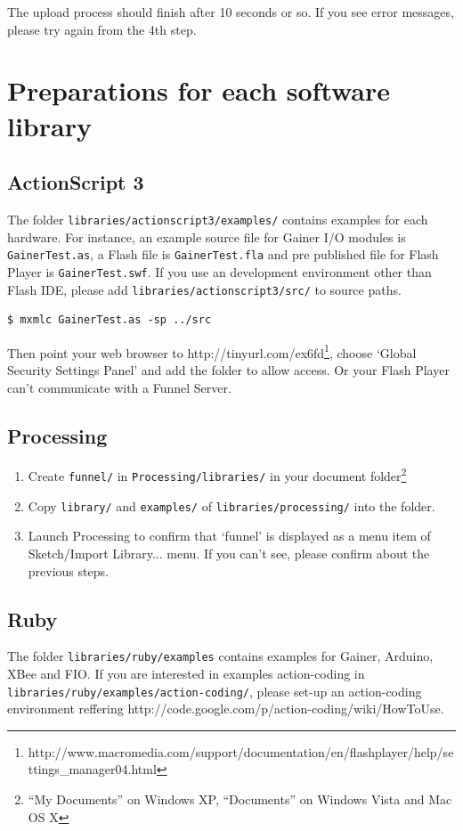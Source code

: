 \documentclass[9pt]{jsarticle}
\begin{document}
The upload process should finish after 10 seconds or so. If you see error messages, please try again from the 4th step.

\clearpage
\section{Preparations for each software library}
\subsection{ActionScript 3}
The folder \texttt{libraries/actionscript3/examples/} contains examples for each hardware. For instance, an example source file for Gainer I/O modules is \texttt{GainerTest.as}, a Flash file is \texttt{GainerTest.fla} and pre published file for Flash Player is \texttt{GainerTest.swf}. If you use an development environment other than Flash IDE, please add \texttt{libraries/actionscript3/src/} to source paths.

\begin{lstlisting}[caption={An example of compile options using mxmlc},label=useless]
$ mxmlc GainerTest.as -sp ../src
\end{lstlisting}

Then point your web browser to http://tinyurl.com/ex6fd\footnote{http://www.macromedia.com/support/documentation/en/flashplayer/help/settings\_manager04.html}, choose `Global Security Settings Panel' and add the folder to allow access. Or your Flash Player can't communicate with a Funnel Server.

\subsection{Processing}
\begin{enumerate}
\item Create \texttt{funnel/} in \texttt{Processing/libraries/} in your document folder\footnote{``My Documents'' on Windows XP, ``Documents'' on Windows Vista and Mac OS X}
\item Copy \texttt{library/} and \texttt{examples/} of \texttt{libraries/processing/} into the folder.
\item Launch Processing to confirm that `funnel' is displayed as a menu item of Sketch/Import Library... menu. If you can't see, please confirm about the previous steps.
\end{enumerate}

\subsection{Ruby}
The folder \texttt{libraries/ruby/examples} contains examples for Gainer, Arduino, XBee and FIO. If you are interested in examples action-coding in \texttt{libraries/ruby/examples/action-coding/}, please set-up an action-coding environment reffering http://code.google.com/p/action-coding/wiki/HowToUse.
\end{document}
